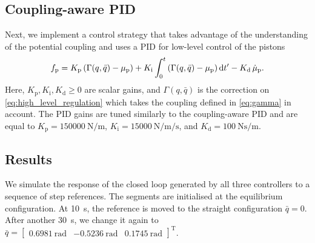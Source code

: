 %
\subsection{Coupling-aware PID}
%
Next, we implement a control strategy that takes advantage of the understanding of the potential coupling and uses a PID for low-level control of the pistons
%
\begin{equation}\small
    f_{\mathrm{p}} = K_\mathrm{p} \left (\Gamma(q, \bar{q})-\mu_\mathrm{p} \right ) +  K_\mathrm{i} \int_{0}^t \left ( \Gamma(q, \bar{q})-\mu_\mathrm{p} \right ) \mathrm{d}t' - K_\mathrm{d} \, \dot{\mu}_\mathrm{p}.
\end{equation}
%
Here, $K_\mathrm{p},K_\mathrm{i},K_\mathrm{d} \geq 0$ are scalar gains, and $\Gamma(q, \bar{q})$ is the correction on \eqref{eq:high_level_regulation} which takes the coupling defined in \eqref{eq:gamma} in account. 
%
The PID gains are tuned similarly to the coupling-aware PID
and are equal to $K_\mathrm{p} = \SI{150 000}{\newton \per \meter}$, $K_\mathrm{i} = \SI{15 000}{\newton \per \meter \per \second}$, and $K_\mathrm{d} = \SI{100}{\newton \second \per \meter}$. 

\subsection{Results}

We simulate the response of the closed loop generated by all three controllers to a sequence of step references. The segments are initialised at the equilibrium configuration. %
At \SI{10}{s}, the reference is moved to the straight configuration $\bar{q} =  0$. After another \SI{30}{s}, we change it again to $\bar{q} = \begin{bmatrix} \SI{0.6981}{\radian} & \SI{-0.5236}{\radian} & \SI{0.1745}{\radian} \end{bmatrix}^\mathrm{T}$.

